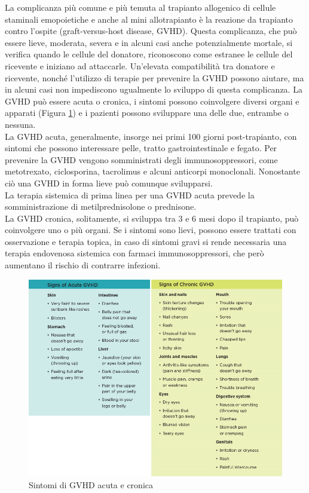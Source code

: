 La complicanza più comune e più temuta al trapianto allogenico di cellule staminali emopoietiche e anche al mini 
allotrapianto è la reazione da trapianto contro l’ospite (graft-versus-host disease, GVHD). Questa complicanza, 
che può essere lieve, moderata, severa e in alcuni casi anche potenzialmente mortale, si verifica quando le cellule 
del donatore, riconoscono come estranee le cellule del ricevente e iniziano ad attaccarle. Un’elevata compatibilità 
tra donatore e ricevente, nonché l’utilizzo di terapie per prevenire la GVHD possono aiutare, ma in alcuni casi non 
impediscono ugualmente lo sviluppo di questa complicanza. 
La GVHD può essere acuta o cronica, i sintomi possono coinvolgere diversi organi e apparati (Figura \ref*{fig:FIGURE_3.17})
e i pazienti possono sviluppare una delle due, entrambe o nessuna\cite{LLSBLOOD}.\\
La GVHD acuta, generalmente, insorge nei primi 100 giorni post-trapianto, con sintomi che possono interessare pelle, 
tratto gastrointestinale e fegato. Per prevenire la GVHD vengono somministrati degli immunosoppressori, come 
metotrexato, ciclosporina, tacrolimus e alcuni anticorpi monoclonali. 
Nonostante ciò una GVHD in forma lieve può comunque svilupparsi\cite{STEMCELLS}.\\
La terapia sistemica di prima linea per una GVHD acuta prevede la somministrazione di metilprednisolone o prednisone\cite{GVHD}.\\
La GVHD cronica, solitamente, si sviluppa tra 3 e 6 mesi dopo il trapianto, può coinvolgere uno o più organi. 
Se i sintomi sono lievi, possono essere trattati con osservazione e terapia topica, in caso di sintomi gravi si rende 
necessaria una terapia endovenosa sistemica con farmaci immunosoppressori, che però aumentano il rischio 
di contrarre infezioni\cite{STEMCELLS}.\\

\begin{figure}[H]
    \begin{center}
    \includegraphics[width=0.9\columnwidth]{img/SignsGVHD.png}
    \end{center}
    \caption{Sintomi di GVHD acuta e cronica
    \cite{img38}}
    \label{fig:FIGURE_3.17}
\end{figure}

